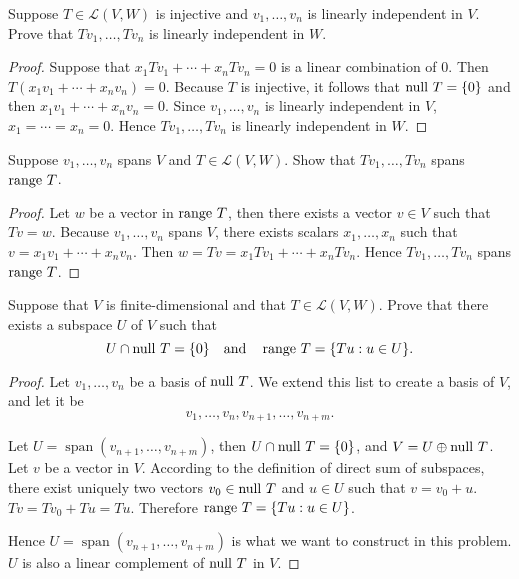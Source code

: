 \begin{exercise}\label{chapter3:sectionB:exercise9}
    Suppose $T \in \mathcal{L}(V, W)$ is injective and $v_{1}, \ldots, v_{n}$ is linearly independent in $V$. Prove that $Tv_{1} , \ldots, Tv_{n}$ is linearly independent in $W$.
\end{exercise}

\begin{proof}
    Suppose that $x_{1}Tv_{1} + \cdots + x_{n}Tv_{n} = 0$ is a linear combination of $0$. Then $T(x_{1}v_{1} + \cdots + x_{n}v_{n}) = 0$. Because $T$ is injective, it follows that $\operatorname{null}\,{T} = \{0\}$ and then $x_{1}v_{1} + \cdots + x_{n}v_{n} = 0$. Since $v_{1}, \ldots, v_{n}$ is linearly independent in $V$, $x_{1} = \cdots = x_{n} = 0$. Hence $Tv_{1} , \ldots, Tv_{n}$ is linearly independent in $W$.
\end{proof}
\newpage

\begin{exercise}
    Suppose $v_{1} ,\ldots, v_{n}$ spans $V$ and $T \in \mathcal{L}(V, W)$. Show that $Tv_{1} , \ldots, Tv_{n}$ spans $\operatorname{range}\,{T}$.
\end{exercise}

\begin{proof}
    Let $w$ be a vector in $\operatorname{range}\,{T}$, then there exists a vector $v\in V$ such that $Tv = w$. Because $v_{1} ,\ldots, v_{n}$ spans $V$, there exists scalars $x_{1}, \ldots, x_{n}$ such that $v = x_{1}v_{1} + \cdots + x_{n}v_{n}$. Then $w = Tv = x_{1}Tv_{1} + \cdots + x_{n}Tv_{n}$. Hence $Tv_{1}, \ldots, Tv_{n}$ spans $\operatorname{range}\,{T}$.
\end{proof}
\newpage

\begin{exercise}\label{chapter3:sectionB:exercise11}
    Suppose that $V$ is finite-dimensional and that $T \in \mathcal{L}(V, W)$. Prove that there exists a subspace $U$ of $V$ such that
    \[
        U \cap \operatorname{null}\,{T} = \{ 0 \}     \quad\text{and}\quad \operatorname{range}\,{T} = \{ Tu: u\in U \}.
    \]
\end{exercise}

\begin{proof}
    Let $v_{1}, \ldots, v_{n}$ be a basis of $\operatorname{null}\,{T}$. We extend this list to create a basis of $V$, and let it be
    \[ v_{1}, \ldots, v_{n}, v_{n+1}, \ldots, v_{n+m}. \]

    Let $U = \operatorname{span}(v_{n+1}, \ldots, v_{n+m})$, then $U\cap \operatorname{null}\,{T} = \{0\}$, and $V = U\oplus \operatorname{null}\,{T}$. Let $v$ be a vector in $V$. According to the definition of direct sum of subspaces, there exist uniquely two vectors $v_{0}\in\operatorname{null}\,{T}$ and $u\in U$ such that $v = v_{0} + u$. $Tv = Tv_{0} + Tu = Tu$. Therefore $\operatorname{range}\,{T} = \{ Tu: u\in U \}$.

    Hence $U = \operatorname{span}(v_{n+1}, \ldots, v_{n+m})$ is what we want to construct in this problem. $U$ is also a linear complement of $\operatorname{null}\,{T}$ in $V$.
\end{proof}
\newpage


